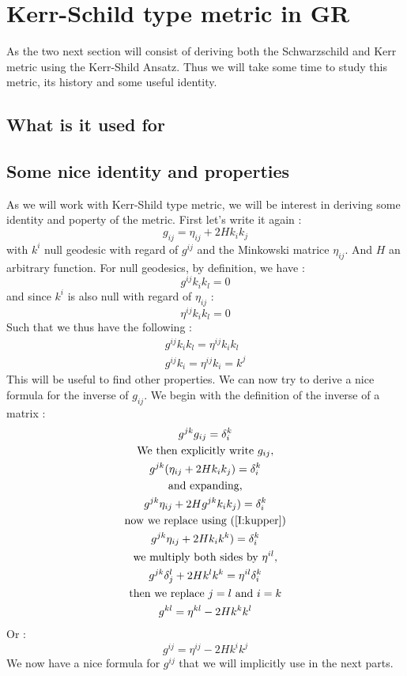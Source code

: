 \documentclass[a4paper,12pt]{article}
\theoremstyle{definition}
\begin{document}
\section{Kerr-Schild type metric in GR}
As the two next section will consist of deriving both the Schwarzschild and Kerr metric using the Kerr-Shild Ansatz.
Thus we will take some time to study this metric, its history and some useful identity.
\subsection{What is it used for}
\subsection{Some nice identity and properties}
As we will work with Kerr-Shild type metric, we will be interest in deriving some identity and poperty of the metric.
First let's write it again :
\begin{equation}
	g_{ij}=\eta_{ij}+2Hk_ik_j
\end{equation}
with $k^i$ null geodesic with regard of $g^{ij}$ and the Minkowski matrice $\eta_{ij}$.
And $H$ an arbitrary function.
For null geodesics, by definition, we have :
\begin{equation}
	g^{ij}k_ik_l=0
\end{equation}
and since $k^i$ is also null with regard of $\eta_{ij}$ :
\begin{equation}
	\eta^{ij}k_ik_l=0
\end{equation}
Such that we thus have the following :
\begin{align}
	g^{ij}k_ik_l=\eta^{ij}k_ik_l \label{I:kequi}\\
	g^{ij}k_i=\eta^{ij}k_i=k^j \label{I:kupper}
\end{align}
This will be useful to find other properties.
We can now try to derive a nice formula for the inverse of $g_{ij}$.
We begin with the definition of the inverse of a matrix :
\begin{gather*}
	g^{jk}g_{ij}=\delta^k_i \\
	\text{We then explicitly write } g_{ij},\\
	g^{jk}(\eta_{ij}+2Hk_ik_j)=\delta^k_i\\
	\text{and expanding,}\\
	g^{jk}\eta_{ij}+2Hg^{jk}k_ik_j)=\delta^k_i\\
	\text{now we replace using (\ref{I:kupper})}\\
	g^{jk}\eta_{ij}+2Hk_ik^k)=\delta^k_i\\
	\text{we multiply both sides by }\eta^{il},\\
	g^{jk}\delta^l_j+2Hk^lk^k=\eta^{il}\delta^k_i\\
	\text{then we replace $j=l$ and $i=k$}\\
	g^{kl}=\eta^{kl}-2Hk^kk^l
\end{gather*}
Or :
\begin{equation}
	g^{ij}=\eta^{ij}-2Hk^ik^j
\end{equation}
We now have a nice formula for $g^{ij}$ that we will implicitly use in the next parts.
\end{document}
